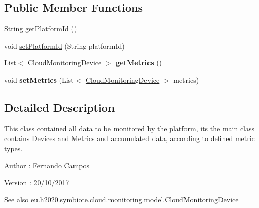 \subsection*{Public Member Functions}
\begin{DoxyCompactItemize}
\item 
String \hyperlink{classeu_1_1h2020_1_1symbiote_1_1cloud_1_1monitoring_1_1model_1_1CloudMonitoringPlatform_a0e0c2ba8fc8fc2f1f3fc4d93120f8182}{get\+Platform\+Id} ()
\item 
void \hyperlink{classeu_1_1h2020_1_1symbiote_1_1cloud_1_1monitoring_1_1model_1_1CloudMonitoringPlatform_a5f8f6a5758a39807209186d7552de063}{set\+Platform\+Id} (String platform\+Id)
\item 
\mbox{\label{classeu_1_1h2020_1_1symbiote_1_1cloud_1_1monitoring_1_1model_1_1CloudMonitoringPlatform_a1e5d3b814654f712c4c5dc6a5543ff59}} 
List$<$ \hyperlink{classeu_1_1h2020_1_1symbiote_1_1cloud_1_1monitoring_1_1model_1_1CloudMonitoringDevice}{Cloud\+Monitoring\+Device} $>$ {\bfseries get\+Metrics} ()
\item 
\mbox{\label{classeu_1_1h2020_1_1symbiote_1_1cloud_1_1monitoring_1_1model_1_1CloudMonitoringPlatform_af0a74dab731c8899884e95c608f3b7e8}} 
void {\bfseries set\+Metrics} (List$<$ \hyperlink{classeu_1_1h2020_1_1symbiote_1_1cloud_1_1monitoring_1_1model_1_1CloudMonitoringDevice}{Cloud\+Monitoring\+Device} $>$ metrics)
\end{DoxyCompactItemize}


\subsection{Detailed Description}
This class contained all data to be monitored by the platform, its the main class contains Devices and Metrics and accumulated data, according to defined metric types.

\begin{DoxyAuthor}{Author}
\+: Fernando Campos 
\end{DoxyAuthor}
\begin{DoxyVersion}{Version}
\+: 20/10/2017
\end{DoxyVersion}
\begin{DoxySeeAlso}{See also}
\hyperlink{classeu_1_1h2020_1_1symbiote_1_1cloud_1_1monitoring_1_1model_1_1CloudMonitoringDevice}{eu.\+h2020.\+symbiote.\+cloud.\+monitoring.\+model.\+Cloud\+Monitoring\+Device} 
\end{DoxySeeAlso}


